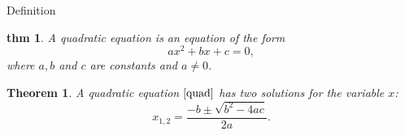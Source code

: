 \documentclass[a4paper]{article}
\begin{document}
\newtheorem{thm}{Theorem}
\newtheorem{dfn}{thm}{Definition}

\begin{dfn}                     %
  A quadratic equation is an equation of the form
  \begin{equation}
    \label{quad}
    ax^2 + bx + c = 0,
  \end{equation}
  where \( a, b \) and \( c \) are constants and \( a \neq 0 \).
\end{dfn}

\begin{thm}                     %
  A quadratic equation \(\ref{quad}\) has two solutions for the variable
  \( x \):
  \begin{equation}
    \label{root}
    x_{1,2} = \frac{-b \pm \sqrt{b^2-4ac}}{2a}.
  \end{equation}
\end{thm}
\end{document}
